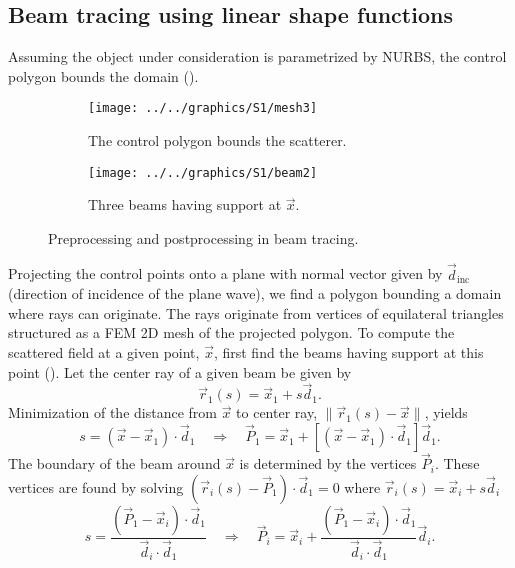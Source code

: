 \subsection{Beam tracing using linear shape functions}
Assuming the object under consideration is parametrized by NURBS, the control polygon bounds the domain ().
\begin{figure}
	\centering
	\begin{subfigure}[t]{0.49\textwidth}
		\centering
		\texttt{[image: ../../graphics/S1/mesh3]}
		\caption{The control polygon bounds the scatterer.}
		\label{Fig:boundingBox}
	\end{subfigure}%
	\hspace*{0.02\textwidth}%
	\begin{subfigure}[t]{0.49\textwidth}
		\centering
		\texttt{[image: ../../graphics/S1/beam2]}
		\caption{Three beams having support at $\vec{x}$.}
		\label{Fig:supportBeam}
	\end{subfigure}
	\caption{Preprocessing and postprocessing in beam tracing.}
\end{figure}
Projecting the control points onto a plane with normal vector given by $\vec{d}_{\mathrm{inc}}$ (direction of incidence of the plane wave), we find a polygon bounding a domain where rays can originate. The rays originate from vertices of equilateral triangles structured as a FEM 2D mesh of the projected polygon. To compute the scattered field at a given point, $\vec{x}$, first find the beams having support at this point (). Let the center ray of a given beam be given by
\begin{equation*}
	\vec{r}_1(s) = \vec{x}_1 + s\vec{d}_1.
\end{equation*}
Minimization of the distance from $\vec{x}$ to center ray, $\|\vec{r}_1(s)-\vec{x}\|$, yields
\begin{equation*}
	s = (\vec{x}-\vec{x}_1)\cdot \vec{d}_1\quad\Rightarrow\quad \vec{P}_1 = \vec{x}_1 + [(\vec{x}-\vec{x}_1)\cdot \vec{d}_1]\vec{d}_1.
\end{equation*}
The boundary of the beam around $\vec{x}$ is determined by the vertices $\vec{P}_i$. These vertices are found by solving $(\vec{r}_i(s)-\vec{P}_1)\cdot \vec{d}_1 = 0$ where $\vec{r}_i(s) = \vec{x}_i + s\vec{d}_i$
\begin{equation*}
	s = \frac{(\vec{P}_1-\vec{x}_i)\cdot\vec{d}_1}{\vec{d}_i\cdot\vec{d}_1}\quad\Rightarrow\quad \vec{P}_i = \vec{x}_i + \frac{(\vec{P}_1-\vec{x}_i)\cdot\vec{d}_1}{\vec{d}_i\cdot\vec{d}_1}\vec{d}_i.
\end{equation*}
